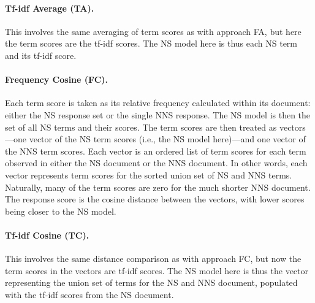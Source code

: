\paragraph{Tf-idf Average (TA).} This involves the same
averaging of term scores as with approach FA, but here the term scores are the tf-idf scores. The NS model here is thus each NS term and its tf-idf score. 

\paragraph{Frequency Cosine (FC).} Each term score is taken as its relative frequency 
calculated within its document: either the NS response set or the single NNS response. The NS model is then the set of all NS terms and their scores. The term scores are then treated as vectors---one vector of the NS term scores (i.e., the NS model here)---and one vector of the NNS term scores. Each vector is an ordered list of term scores for each term observed in either the NS document or the NNS document. In other words, each vector represents term scores for the sorted union set of NS and NNS terms. Naturally, many of the term scores are zero for the much shorter NNS document. The response score is the cosine distance between the vectors, with lower scores being closer to the NS model.

\paragraph{Tf-idf Cosine (TC).} This involves the same distance comparison as with approach FC, but now the term scores in the vectors are tf-idf scores. The NS model here is thus the vector representing the union set of terms for the NS and NNS document, populated with the tf-idf scores from the NS document.

\bigskip

